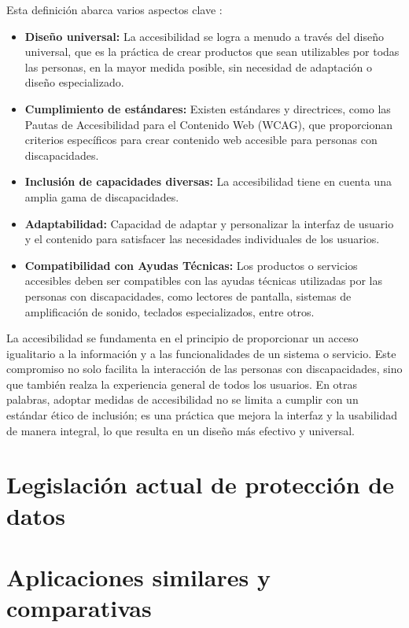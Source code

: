 Esta definición abarca varios aspectos clave \cite{principios_accesibilidad}: 

\begin{itemize}
	\item \textbf{Diseño universal: } La accesibilidad se logra a menudo a través del diseño universal, que es la práctica de crear productos que sean utilizables por todas las personas, en la mayor medida posible, sin necesidad de adaptación o diseño especializado.
	\item \textbf{Cumplimiento de estándares: } Existen estándares y directrices, como las Pautas de Accesibilidad para el Contenido Web (WCAG), que proporcionan criterios específicos para crear contenido web accesible para personas con discapacidades.
	\item \textbf{Inclusión de capacidades diversas: } La accesibilidad tiene en cuenta una amplia gama de discapacidades.
	\item \textbf{Adaptabilidad: } Capacidad de adaptar y personalizar la interfaz de usuario y el contenido para satisfacer las necesidades individuales de los usuarios.
	\item \textbf{Compatibilidad con Ayudas Técnicas: } Los productos o servicios accesibles deben ser compatibles con las ayudas técnicas utilizadas por las personas con discapacidades, como lectores de pantalla, sistemas de amplificación de sonido, teclados especializados, entre otros.
\end{itemize}

La accesibilidad se fundamenta en el principio de proporcionar un acceso igualitario a la información y a las funcionalidades de un sistema o servicio. Este compromiso no solo facilita la interacción de las personas con discapacidades, sino que también realza la experiencia general de todos los usuarios. En otras palabras, adoptar medidas de accesibilidad no se limita a cumplir con un estándar ético de inclusión; es una práctica que mejora la interfaz y la usabilidad de manera integral, lo que resulta en un diseño más efectivo y universal. \cite{fernandez2021accesibilidad}

\newpage

\section{Legislación actual de protección de datos}

\section{Aplicaciones similares y comparativas}
